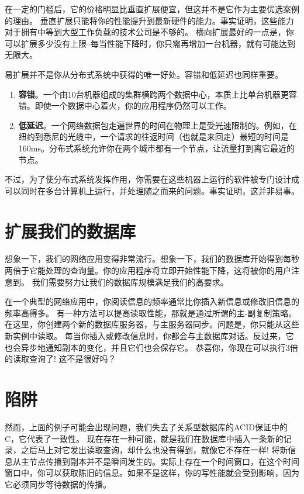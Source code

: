\documentclass[degree=project,degree-type=project,cjk-font=noto]{thuthesis}
\begin{document}
在一定的门槛后，它的价格明显比垂直扩展便宜，但这并不是它作为主要优选案例的理由。
垂直扩展只能将你的性能提升到最新硬件的能力。事实证明，这些能力对于拥有中等到大型工作负载的技术公司是不够的。
横向扩展最好的一点是，你可以扩展多少没有上限--每当性能下降时，你只需再增加一台机器，就有可能达到无限大。

易扩展并不是你从分布式系统中获得的唯一好处。容错和低延迟也同样重要。

\begin{enumerate}
  \item \textbf{容错}。一个由10台机器组成的集群横跨两个数据中心，本质上比单台机器更容错。即使一个数据中心着火，你的应用程序仍然可以工作。
  \item \textbf{低延迟}。一个网络数据包走遍世界的时间在物理上是受光速限制的。例如，在纽约到悉尼的光缆中，一个请求的往返时间（也就是来回走）最短的时间是160ms。分布式系统允许你在两个城市都有一个节点，让流量打到离它最近的节点。
\end{enumerate}

不过，为了使分布式系统发挥作用，你需要在这些机器上运行的软件被专门设计成可以同时在多台计算机上运行，并处理随之而来的问题。事实证明，这并非易事。

\section{扩展我们的数据库}

想象一下，我们的网络应用变得非常流行。想象一下，我们的数据库开始得到每秒两倍于它能处理的查询量。你的应用程序将立即开始性能下降，这将被你的用户注意到。
我们需要努力让我们的数据库规模满足我们的高要求。

在一个典型的网络应用中，你阅读信息的频率通常比你插入新信息或修改旧信息的频率高得多。
有一种方法可以提高读取性能，那就是通过所谓的主-副复制策略。在这里，你创建两个新的数据库服务器，与主服务器同步。问题是，你只能从这些新实例中读取。
每当你插入或修改信息时，你都会与主数据库对话。反过来，它也会异步地通知副本的变化，并且它们也会保存它。
恭喜你，你现在可以执行3倍的读取查询了! 这不是很好吗？

\section{陷阱}

然而，上面的例子可能会出现问题，我们失去了关系型数据库的ACID保证中的C，它代表了一致性。
现在存在一种可能，就是我们在数据库中插入一条新的记录，之后马上对它发出读取查询，却什么也没有得到，就像它不存在一样!
将新信息从主节点传播到副本并不是瞬间发生的。实际上存在一个时间窗口，在这个时间窗口中，你可以获取陈旧的信息。如果不是这样，你的写性能就会受到影响，因为它必须同步等待数据的传播。
\end{document}

